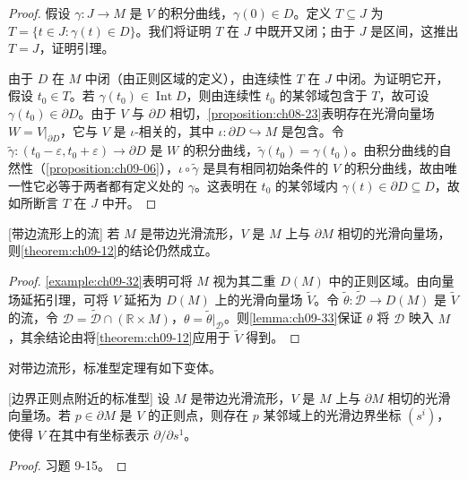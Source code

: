 \documentclass[../../main.tex]{subfiles}
\begin{document}
\begin{proof}
假设 $\gamma\colon J\to M$ 是 $V$ 的积分曲线，$\gamma(0)\in D$。定义 $T\subseteq J$ 为 $T=\{t\in J:\gamma(t)\in D\}$。我们将证明 $T$ 在 $J$ 中既开又闭；由于 $J$ 是区间，这推出 $T=J$，证明引理。

由于 $D$ 在 $M$ 中闭（由正则区域的定义），由连续性 $T$ 在 $J$ 中闭。为证明它开，假设 $t_0\in T$。若 $\gamma(t_0)\in\operatorname{Int}D$，则由连续性 $t_0$ 的某邻域包含于 $T$，故可设 $\gamma(t_0)\in\partial D$。由于 $V$ 与 $\partial D$ 相切，\cref{proposition:ch08-23}表明存在光滑向量场 $W=V|_{\partial D}$，它与 $V$ 是 $\iota$-相关的，其中 $\iota\colon\partial D\hookrightarrow M$ 是包含。令 $\widetilde{\gamma}\colon(t_0-\varepsilon,t_0+\varepsilon)\to\partial D$ 是 $W$ 的积分曲线，$\widetilde{\gamma}(t_0)=\gamma(t_0)$。由积分曲线的自然性（\cref{proposition:ch09-06}），$\iota\circ\widetilde{\gamma}$ 是具有相同初始条件的 $V$ 的积分曲线，故由唯一性它必等于两者都有定义处的 $\gamma$。这表明在 $t_0$ 的某邻域内 $\gamma(t)\in\partial D\subseteq D$，故如所断言 $T$ 在 $J$ 中开。
\end{proof}

\begin{theorem}\label{theorem:ch09-34}[带边流形上的流]
若 $M$ 是带边光滑流形，$V$ 是 $M$ 上与 $\partial M$ 相切的光滑向量场，则\cref{theorem:ch09-12}的结论仍然成立。
\end{theorem}

\begin{proof}
\cref{example:ch09-32}表明可将 $M$ 视为其二重 $D(M)$ 中的正则区域。由向量场延拓引理，可将 $V$ 延拓为 $D(M)$ 上的光滑向量场 $\widetilde{V}$。令 $\widetilde{\theta}\colon\widetilde{\mathscr{D}}\to D(M)$ 是 $\widetilde{V}$ 的流，令 $\mathscr{D}=\widetilde{\mathscr{D}}\cap(\mathbb{R}\times M)$，$\theta=\widetilde{\theta}|_{\mathscr{D}}$。则\cref{lemma:ch09-33}保证 $\theta$ 将 $\mathscr{D}$ 映入 $M$，其余结论由将\cref{theorem:ch09-12}应用于 $\widetilde{V}$ 得到。
\end{proof}

对带边流形，标准型定理有如下变体。

\begin{theorem}\label{theorem:ch09-35}[边界正则点附近的标准型]
设 $M$ 是带边光滑流形，$V$ 是 $M$ 上与 $\partial M$ 相切的光滑向量场。若 $p\in\partial M$ 是 $V$ 的正则点，则存在 $p$ 某邻域上的光滑边界坐标 $(s^i)$，使得 $V$ 在其中有坐标表示 $\partial/\partial s^1$。
\end{theorem}

\begin{proof}
习题 9-15。
\end{proof}
\end{document}
